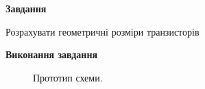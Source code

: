 \documentclass[a4paper,14pt]{extreport}
\begin{document}
\newpage
\setcounter{page}{2}


\begin{center}
    \textbf{Завдання}
\end{center}
Розрахувати геометричні розміри транзисторів


\begin{center}
  \textbf{Виконання завдання}
\end{center}

\begin{figure}[h!]
\caption{Прототип схеми.}
\label{ris1}
\end{figure}
\end{document}
